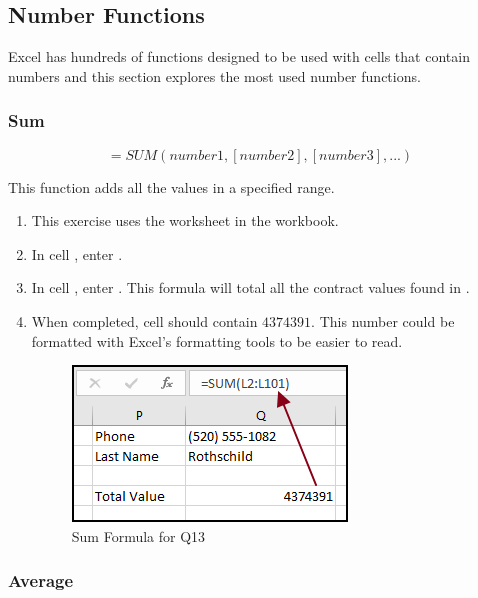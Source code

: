 \subsection{Number Functions}

Excel has hundreds of functions designed to be used with cells that contain numbers and this section explores the most used number functions.

\subsubsection{Sum}

\[ =SUM(number1, [number2], [number3], ...) \]

This function adds all the values in a specified range. 

\begin{enumbox}
	\begin{enumerate}
		\item This exercise uses the  worksheet in the  workbook.
		\item In cell , enter .
		\item In cell , enter . This formula will total all the contract values found in .
		\item When completed, cell  should contain $ 4374391 $. This number could be formatted with Excel's formatting tools to be easier to read.
	
		\begin{figure}[H]
			\centering
			\includegraphics[width=\maxwidth{.75\linewidth}]{gfx/ch09_fig38}
			\caption{Sum Formula for Q13}
			\label{09:fig38}
		\end{figure}
		
	\end{enumerate}
\end{enumbox}
	
\subsubsection{Average}

